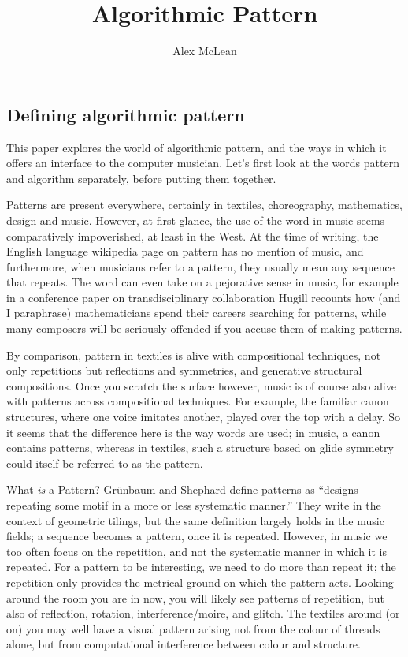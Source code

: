 \documentclass[
]{article}
\title{Algorithmic Pattern}
\author{Alex McLean}
\date{}
\begin{document}
\maketitle

\hypertarget{defining-algorithmic-pattern}{%
\subsection{Defining algorithmic
pattern}\label{defining-algorithmic-pattern}}

This paper explores the world of algorithmic pattern, and the ways in
which it offers an interface to the computer musician. Let's first look
at the words pattern and algorithm separately, before putting them
together.

Patterns are present everywhere, certainly in textiles, choreography,
mathematics, design and music. However, at first glance, the use of the
word in music seems comparatively impoverished, at least in the West. At
the time of writing, the English language wikipedia page on pattern has
no mention of music, and furthermore, when musicians refer to a pattern,
they usually mean any sequence that repeats. The word can even take on a
pejorative sense in music, for example in a conference paper on
transdisciplinary collaboration Hugill recounts how (and I paraphrase)
mathematicians spend their careers searching for patterns, while many
composers will be seriously offended if you accuse them of making
patterns.

By comparison, pattern in textiles is alive with compositional
techniques, not only repetitions but reflections and symmetries, and
generative structural compositions. Once you scratch the surface
however, music is of course also alive with patterns across
compositional techniques. For example, the familiar canon structures,
where one voice imitates another, played over the top with a delay. So
it seems that the difference here is the way words are used; in music, a
canon contains patterns, whereas in textiles, such a structure based on
glide symmetry could itself be referred to as the pattern.

What \emph{is} a Pattern? Grünbaum and Shephard define patterns as
``designs repeating some motif in a more or less systematic manner.''
They write in the context of geometric tilings, but the same definition
largely holds in the music fields; a sequence becomes a pattern, once it
is repeated. However, in music we too often focus on the repetition, and
not the systematic manner in which it is repeated. For a pattern to be
interesting, we need to do more than repeat it; the repetition only
provides the metrical ground on which the pattern acts. Looking around
the room you are in now, you will likely see patterns of repetition, but
also of reflection, rotation, interference/moire, and glitch. The
textiles around (or on) you may well have a visual pattern arising not
from the colour of threads alone, but from computational interference
between colour and structure.
\end{document}
